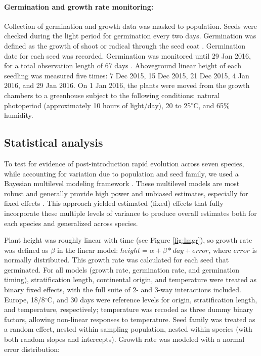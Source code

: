 \documentclass[11pt]{article}\usepackage[]{graphicx}\usepackage[]{color}
\begin{document}
	\paragraph{Germination and growth rate monitoring:}  Collection of germination and growth data was masked to population. Seeds were checked during the light period for germination every two days. Germination was defined as the growth of shoot or radical through the seed coat \parencite{Baskin1998,Popay1970}. Germination date for each seed was recorded.  Germination was monitored until 29 Jan 2016, for a total observation length of 67 days  \parencite[this is longer than the typical two-week germination trials according to][]{Baskin1998,Wulff1994}. Aboveground linear height of each seedling was measured five times: 7 Dec 2015, 15 Dec 2015, 21 Dec 2015, 4 Jan 2016, and 29 Jan 2016. On 1 Jan 2016, the plants were moved from the growth chambers to a greenhouse subject to the following conditions: natural photoperiod (approximately 10 hours of light/day), 20 to 25$^\circ$C, and 65\% humidity.
	\subsection{Statistical analysis} 
	To test for evidence of post-introduction rapid evolution across seven species, while accounting for variation due to population and seed family, we used a Bayesian multilevel modeling framework \parencite{Carpenter2017}. These multilevel models are most
robust and generally provide high power and unbiased estimates, especially for fixed effects \parencite{Paccagnella2011}. This approach yielded estimated (fixed) effects that fully incorporate these multiple levels of variance to produce overall estimates both for each species and generalized across species. 

Plant height was roughly linear with time (see Figure \ref{fig:lmgr}), so growth rate was defined as $\beta$ in the linear model: $height = \alpha + \beta*day + error $, where $error$ is normally distributed. This growth rate was calculated for each seed that germinated. For all models (growth rate, germination rate, and germination timing), stratification length, continental origin, and temperature were treated as binary fixed effects, with the full suite of 2- and 3-way interactions included. Europe, 18/8$^\circ$C, and 30 days were reference levels for origin, stratification length, and temperature, respectively; temperature was recoded as three dummy binary factors, allowing non-linear responses to temperature. Seed family was treated as a random effect, nested within sampling population, nested within species (with both random slopes and intercepts). Growth rate was modeled with a normal error distribution: 
\end{document}
